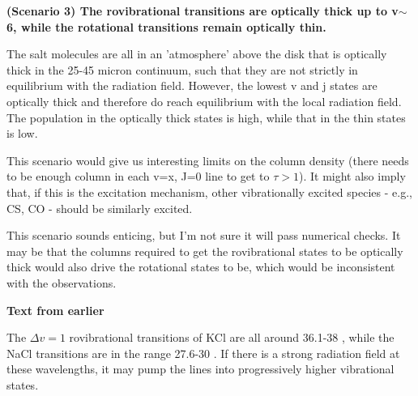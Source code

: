 \documentclass[twocolumn]{aastex62}
\newcommand{\bam}[1]{\textcolor{green!65!black}{\textbf{[BAM: #1]}}}
\newcommand{\ag}[1]{\textcolor{red!65!black}{\textbf{[AG: #1]}}}
\begin{document}
\textbf{(Scenario 3) The rovibrational transitions are optically thick up to v$\sim$6, while the rotational transitions remain optically thin.}

The salt molecules are all in an 'atmosphere' above the disk that is optically
thick in the 25-45 micron continuum, such that they are not strictly in
equilibrium with the radiation field.  However, the lowest v and j states are
optically thick and therefore do reach equilibrium with the local radiation
field.  The population in the optically thick states is high, while that in the
thin states is low.  

This scenario would give us interesting limits on the column density (there
needs to be enough column in each v=x, J=0 line to get to $\tau>1$).  It might
also imply that, if this is the excitation mechanism, other vibrationally
excited species - e.g., CS, CO - should be similarly excited.

This scenario sounds enticing, but I'm not sure it will pass numerical checks.
It may be that the columns required to get the rovibrational states to be
optically thick would also drive the rotational states to be, which would be
inconsistent with the observations.


\textbf{Text from earlier}

The $\Delta v=1$ rovibrational transitions of KCl are all around 36.1-38 \um,
while the NaCl transitions are in the range 27.6-30 \um.  If there is a strong
radiation field at these wavelengths, it may pump the lines into progressively
higher vibrational states.

\end{document}

